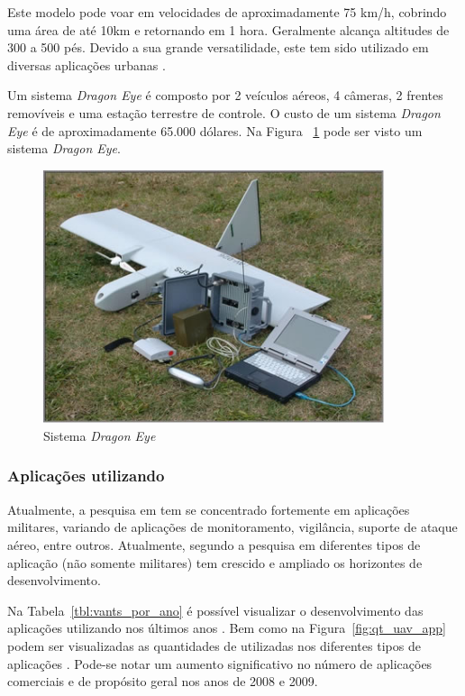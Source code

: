 Este modelo pode voar em velocidades de aproximadamente 75 km/h, cobrindo uma área de até 10km e retornando em 1 hora. Geralmente alcança altitudes de 300 a 500 pés.
Devido a sua grande versatilidade, este \vant tem sido utilizado em diversas aplicações urbanas \cite{Drew2005,uav_roadmap2005}.

Um sistema \emph{Dragon Eye} é composto por 2 veículos aéreos, 4 câmeras, 2 frentes removíveis e uma estação terrestre de controle. O custo de um sistema \emph{Dragon Eye} é
de aproximadamente 65.000 dólares. Na Figura ~\ref{fig:dragon_eye} pode ser visto um sistema \emph{Dragon Eye}.

\begin{figure}[h!]
\centering
\includegraphics[width=10cm]{pictures/dragon_eye_system.jpg}
\caption{Sistema \emph{Dragon Eye} }
 \label{fig:dragon_eye}
\end{figure}


\subsubsection{Aplicações utilizando \vants}
Atualmente, a pesquisa em \vants tem se concentrado fortemente em aplicações militares, variando de aplicações de monitoramento, vigilância, suporte de ataque aéreo, entre outros. Atualmente, segundo \cite{Valavanis2007} a pesquisa em diferentes tipos de aplicação (não somente militares) tem crescido e ampliado os horizontes de desenvolvimento.

Na Tabela~\ref{tbl:vants_por_ano} é possível visualizar o desenvolvimento das aplicações utilizando \vants nos últimos anos \cite{Bryner2007}. Bem como na Figura~\ref{fig:qt_uav_app} podem ser visualizadas as quantidades de \vants utilizadas nos diferentes tipos de aplicações \cite{Bryner2007}. Pode-se notar um aumento significativo no número de aplicações comerciais e de propósito geral nos anos de 2008 e 2009.


